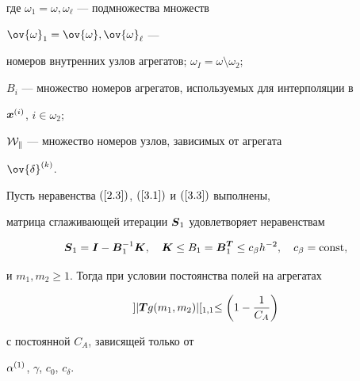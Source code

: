 где $\omega_1=\omega, \omega_\ell$ --- подмножества множеств


$\ov{\omega}_1=\ov{\omega}, \ov{\omega}_\ell$ ---


номеров внутренних узлов агрегатов; $\omega_I=\omega \setminus\omega_2$;


$B_i$ --- множество номеров агрегатов, используемых для интерполяции в


${\boldsymbol x}^{(i)}$, $i\in\omega_2$;





$\cal W_k$ --- множество номеров узлов, зависимых от агрегата 


$\ov{\delta}\up k$.





\begin{lems}


Пусть неравенства $(\ref{2.3})$, $(\ref{3.1})$ и $(\ref{3.3})$ выполнены,


матрица сглаживающей итерации ${\boldsymbol S}_1$ удовлетворяет неравенствам


\begin{equation}\label{4.2}


{\bi S}_1={\bi I}-{\bi B}_1^{-1}{\bi K},\quad {\bi K}\le B_1


={\bi B}^{\bi T}_1\le c_{\beta} h^{-2},\quad


c_{\beta}=\const,


\end{equation}


и $m_1, m_2\ge 1$. Тогда при условии постоянства полей на агрегатах


\begin{equation}\label{4.3}


]|{\bi Tg}(m_1, m_2)|[_{1,1}\le\bigg(1-\frac{1}{C_A}\bigg)


\end{equation}


с постоянной $C_A$, зависящей только от


$\alpha^{(1)}$, $\gamma$, $c_0$, $c_\delta$.


\end{lems}





